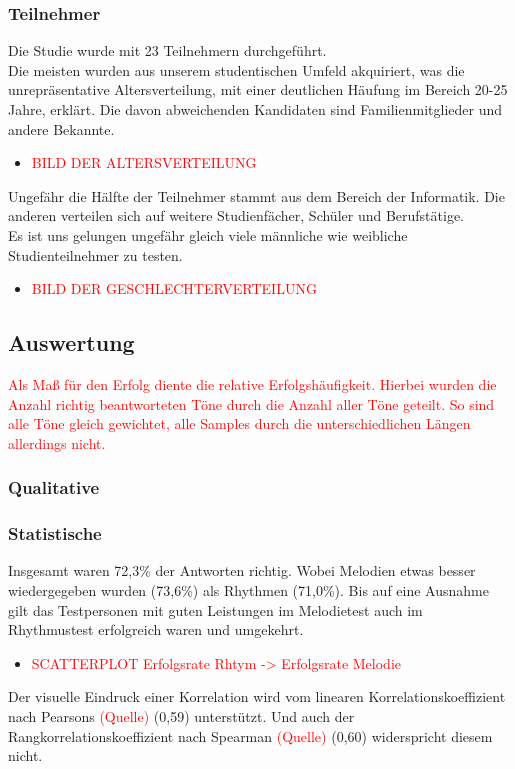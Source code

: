 \documentclass{acm_proc_article-sp}
\begin{document}
\subsubsection{Teilnehmer}
Die Studie wurde mit 23 Teilnehmern durchgeführt.\\
Die meisten wurden aus unserem studentischen Umfeld akquiriert, was die unrepräsentative Altersverteilung, mit einer deutlichen Häufung im Bereich 20-25 Jahre, erklärt. Die davon abweichenden Kandidaten sind Familienmitglieder und andere Bekannte.
\begin{itemize} 
\item \textcolor{red}{BILD DER ALTERSVERTEILUNG}
\end{itemize}
Ungefähr die Hälfte der Teilnehmer stammt aus dem Bereich der Informatik. Die anderen verteilen sich auf weitere Studienfächer, Schüler und Berufstätige.\\
Es ist uns gelungen ungefähr gleich viele männliche wie weibliche Studienteilnehmer zu testen. 
\begin{itemize} 
\item \textcolor{red}{BILD DER GESCHLECHTERVERTEILUNG}
\end{itemize}
\subsection{Auswertung}
\textcolor{red}{Als Maß für den Erfolg diente die relative Erfolgshäufigkeit. Hierbei wurden die Anzahl richtig beantworteten Töne durch die Anzahl aller Töne geteilt. So sind alle Töne gleich gewichtet, alle Samples durch die unterschiedlichen Längen allerdings nicht.}
\subsubsection{Qualitative}
\subsubsection{Statistische}
Insgesamt waren 72,3\% der Antworten richtig. Wobei Melodien etwas besser wiedergegeben wurden (73,6\%) als Rhythmen (71,0\%). Bis auf eine Ausnahme gilt das Testpersonen mit guten Leistungen im Melodietest auch im Rhythmustest erfolgreich waren und umgekehrt.
\begin{itemize} 
\item \textcolor{red}{SCATTERPLOT Erfolgsrate Rhtym -> Erfolgsrate Melodie}
\end{itemize}
Der visuelle Eindruck einer Korrelation wird vom linearen Korrelationskoeffizient nach Pearsons \textcolor{red}{(Quelle)} (0,59) unterstützt. Und auch der Rangkorrelationskoeffizient nach Spearman \textcolor{red}{(Quelle)} (0,60) widerspricht diesem nicht.\\
\end{document}
